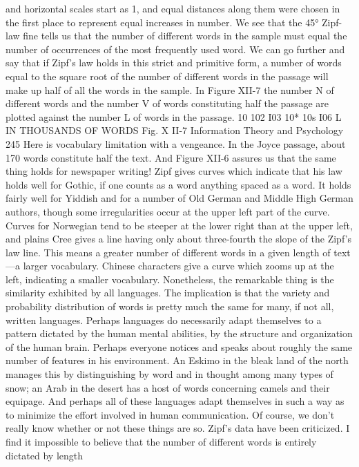 {{{{{{{{{{{{and horizontal scales start as 1, and equal distances along them
were chosen in the first place to represent equal increases in
number. We see that the 45° Zipf-law fine tells us that the number
of different words in the sample must equal the number of occurrences
of the most frequently used word.
We can go further and say that if Zipf’s law holds in this strict
and primitive form, a number of words equal to the square root
of the number of different words in the passage will make up half
of all the words in the sample. In Figure XII-7 the number N of
different words and the number V of words constituting half the
passage are plotted against the number L of words in the passage.
10 102 I03 10* 10s I06
L IN THOUSANDS OF WORDS
Fig. X II-7
Information Theory and Psychology
245
Here is vocabulary limitation with a vengeance. In the Joyce
passage, about 170 words constitute half the text. And Figure
XII-6 assures us that the same thing holds for newspaper writing!
Zipf gives curves which indicate that his law holds well for
Gothic, if one counts as a word anything spaced as a word. It holds
fairly well for Yiddish and for a number of Old German and
Middle High German authors, though some irregularities occur
at the upper left part of the curve. Curves for Norwegian tend to
be steeper at the lower right than at the upper left, and plains Cree
gives a line having only about three-fourth the slope of the Zipf’s
law line. This means a greater number of different words in a
given length of text—a larger vocabulary. Chinese characters give
a curve which zooms up at the left, indicating a smaller vocabulary.
Nonetheless, the remarkable thing is the similarity exhibited by
all languages. The implication is that the variety and probability
distribution of words is pretty much the same for many, if not all,
written languages. Perhaps languages do necessarily adapt themselves
to a pattern dictated by the human mental abilities, by the
structure and organization of the human brain. Perhaps everyone
notices and speaks about roughly the same number of features in
his environment. An Eskimo in the bleak land of the north manages
this by distinguishing by word and in thought among many
types of snow; an Arab in the desert has a host of words concerning
camels and their equipage. And perhaps all of these languages
adapt themselves in such a way as to minimize the effort involved
in human communication. Of course, we don’t really know whether
or not these things are so.
Zipf’s data have been criticized. I find it impossible to believe
that the number of different words is entirely dictated by length
}}}}}}}}}}}}
